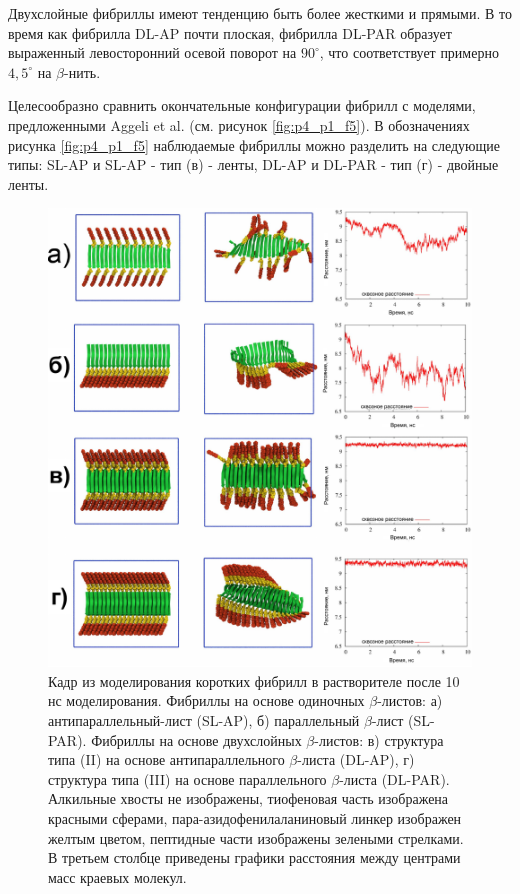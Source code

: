     Двухслойные фибриллы имеют тенденцию быть более жесткими и прямыми. В то время как фибрилла DL-AP почти плоская, фибрилла DL-PAR образует выраженный левосторонний осевой поворот на $90^{\circ}$, что соответствует примерно $4,5^{\circ}$ на $\beta$-нить.
    
    Целесообразно сравнить окончательные конфигурации фибрилл с моделями, предложенными Aggeli et al. (см. рисунок \ref{fig:p4_p1_f5}). В обозначениях рисунка \ref{fig:p4_p1_f5} наблюдаемые фибриллы можно разделить на следующие типы: SL-AP и SL-AP - тип (в) - ленты, DL-AP и DL-PAR - тип (г) - двойные ленты.

\begin{figure} [H]
    \centering
    \includegraphics[width=\textwidth]{images/p4/punkt5/part4_p5_f36.pdf}
    \caption[Кадр из моделирования коротких фибрилл в растворителе после 10 нс моделирования]{Кадр из моделирования коротких фибрилл в растворителе после 10 нс моделирования. Фибриллы на основе одиночных $\beta$-листов: а) антипараллельный-лист (SL-AP), б) параллельный $\beta$-лист (SL-PAR). Фибриллы на основе двухслойных $\beta$-листов: в) структура типа (II) на основе антипараллельного $\beta$-листа (DL-AP), г) структура типа (III) на основе параллельного $\beta$-листа (DL-PAR). Алкильные хвосты не изображены, тиофеновая часть изображена красными сферами, пара-азидофенилаланиновый линкер изображен желтым цветом, пептидные части изображены зелеными стрелками. В третьем столбце приведены графики расстояния между центрами масс краевых молекул.}
    \label{fig:p4_p5_f36}
\end{figure}

